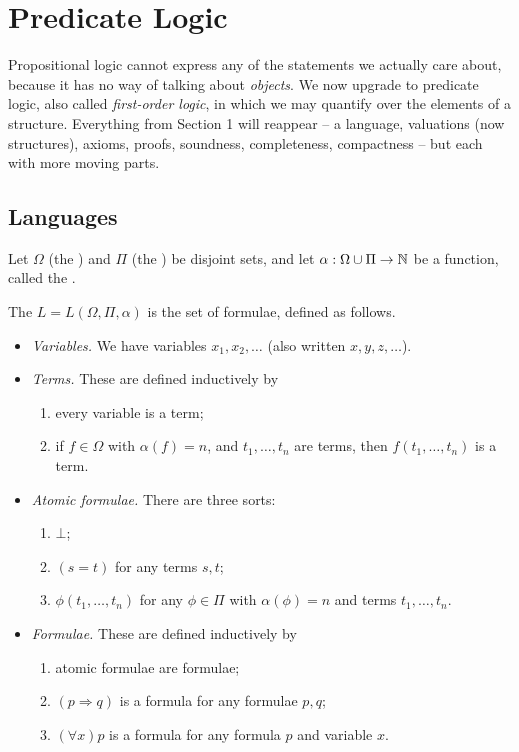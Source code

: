 \documentclass[a4paper]{scrartcl}
\begin{document}
\section{Predicate Logic}\label{sec:predicate}

Propositional logic cannot express any of the statements we actually care about, because it has no way of talking about \emph{objects}. We now upgrade to predicate logic, also called \emph{first-order logic}, in which we may quantify over the elements of a structure. Everything from Section 1 will reappear -- a language, valuations (now structures), axioms, proofs, soundness, completeness, compactness -- but each with more moving parts.

\subsection{Languages}

\begin{definition}[Language]
  Let $\Omega$ (the ) and $\Pi$ (the ) be disjoint sets, and let $\alpha: \Omega \cup \Pi \rightarrow \mathbb{N}$ be a function, called the .

  The  $L = L(\Omega, \Pi, \alpha)$ is the set of formulae, defined as follows.
  \begin{itemize}
    \item \emph{Variables.} We have variables $x_1, x_2, \dots$ (also written $x, y, z, \dots$).
    \item \emph{Terms.} These are defined inductively by
    \begin{enumerate}[label=(\roman*)]
      \item every variable is a term;
      \item if $f \in \Omega$ with $\alpha(f) = n$, and $t_1, \dots, t_n$ are terms, then $f(t_1, \dots, t_n)$ is a term.
    \end{enumerate}
    \item \emph{Atomic formulae.} There are three sorts:
    \begin{enumerate}[label=(\roman*)]
      \item $\bot$;
      \item $(s = t)$ for any terms $s, t$;
      \item $\phi(t_1, \dots, t_n)$ for any $\phi \in \Pi$ with $\alpha(\phi) = n$ and terms $t_1, \dots, t_n$.
    \end{enumerate}
    \item \emph{Formulae.} These are defined inductively by
    \begin{enumerate}[label=(\roman*)]
      \item atomic formulae are formulae;
      \item $(p \Rightarrow q)$ is a formula for any formulae $p, q$;
      \item $(\forall x) p$ is a formula for any formula $p$ and variable $x$.
    \end{enumerate}
  \end{itemize}
\end{definition}
\end{document}
